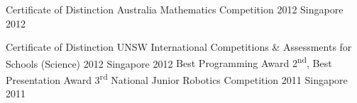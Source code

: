 \begin{cvhonors}
  \cvhonor
    {Certificate of Distinction} %
    {Australia Mathematics Competition 2012} %
    {Singapore} %
    {2012} %
    
  \cvhonor
    {Certificate of Distinction} %
    {UNSW International Competitions \& Assessments for Schools (Science) 2012} %
    {Singapore} %
    {2012} %
  \cvhonor
    {Best Programming Award 2\textsuperscript{nd}, Best Presentation Award 3\textsuperscript{rd}} %
    {National Junior Robotics Competition 2011} %
    {Singapore} %
    {2011} %
\end{cvhonors}
